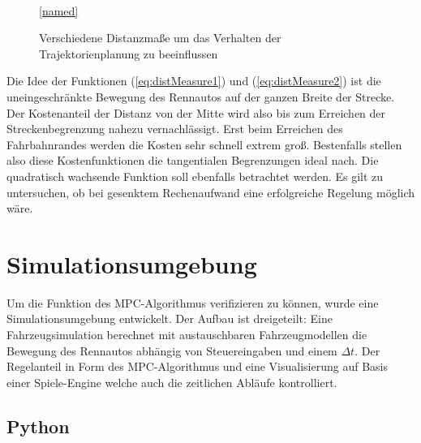 \documentclass{like}
\begin{document}
\begin{figure}[ht!]
	\centering
	 
	\\
	\ref{named}
	\caption{Verschiedene Distanzmaße um das Verhalten der Trajektorienplanung zu beeinflussen}
	\label{fig:elasticCost}
\end{figure}

Die Idee der Funktionen (\ref{eq:distMeasure1}) und (\ref{eq:distMeasure2}) ist die uneingeschränkte Bewegung des Rennautos auf der ganzen Breite der Strecke. Der Kostenanteil der Distanz von der Mitte wird also bis zum Erreichen der Streckenbegrenzung nahezu vernachlässigt. Erst beim Erreichen des Fahrbahnrandes werden die Kosten sehr schnell extrem groß. Bestenfalls stellen also diese Kostenfunktionen die tangentialen Begrenzungen ideal nach. Die quadratisch wachsende Funktion soll ebenfalls betrachtet werden. Es gilt zu untersuchen, ob bei gesenktem Rechenaufwand eine erfolgreiche Regelung möglich wäre.

\chapter{Simulationsumgebung}
Um die Funktion des \ac{MPC}-Algorithmus verifizieren zu können, wurde eine Simulationsumgebung entwickelt. Der Aufbau ist dreigeteilt: Eine Fahrzeugsimulation berechnet mit austauschbaren Fahrzeugmodellen die Bewegung des Rennautos abhängig von Steuereingaben und einem $\Delta t$. Der Regelanteil in Form des \ac{MPC}-Algorithmus und eine Visualisierung auf Basis einer Spiele-Engine welche auch die zeitlichen Abläufe kontrolliert. 

\section{Python}
\end{document}
